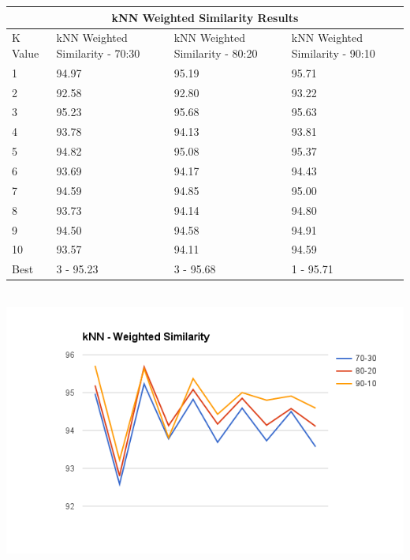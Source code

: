 \documentclass[paper=a4, fontsize=11pt]{scrartcl}
\numberwithin{equation}{section}		%
\numberwithin{figure}{section}			%
\numberwithin{table}{section}				%
\begin{document}
\begin{tabular}{ |p{2cm}||p{4cm}|p{4cm}|p{4cm}| }
 \hline
 \multicolumn{4}{|c|}{kNN Weighted Similarity Results} \\
 \hline
K Value & kNN Weighted Similarity - 70:30 & kNN Weighted Similarity - 80:20 & kNN Weighted Similarity - 90:10\\
 \hline
1 & 94.97 & 95.19 & 95.71 \\
2 & 92.58 & 92.80 & 93.22 \\
3 & 95.23 & 95.68 & 95.63 \\
4 & 93.78 & 94.13 & 93.81 \\
5 & 94.82 & 95.08 & 95.37 \\
6 & 93.69 & 94.17 & 94.43 \\
7 & 94.59 & 94.85 & 95.00 \\
8 & 93.73 & 94.14 & 94.80 \\
9 & 94.50 & 94.58 & 94.91 \\
10 & 93.57 & 94.11 & 94.59 \\
 \hline
 Best & 3 - 95.23 & 3 - 95.68 & 1 - 95.71 \\
 \hline
\end{tabular}
\\
\includegraphics[width=\textwidth]{knnsimilar.png}
\\
\end{document}
